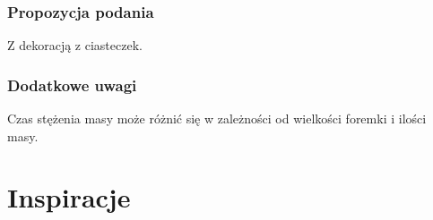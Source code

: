 \documentclass[a4paper,10pt]{book}
\begin{document}
\vspace{0.5cm} 

\small
\subsection*{Propozycja podania}
Z dekoracją z ciasteczek.

\vspace{0.3cm}

\subsection*{Dodatkowe uwagi}
Czas stężenia masy może różnić się w zależności od wielkości foremki i ilości masy.

\newpage 

\chapter{Inspiracje}
\end{document}
